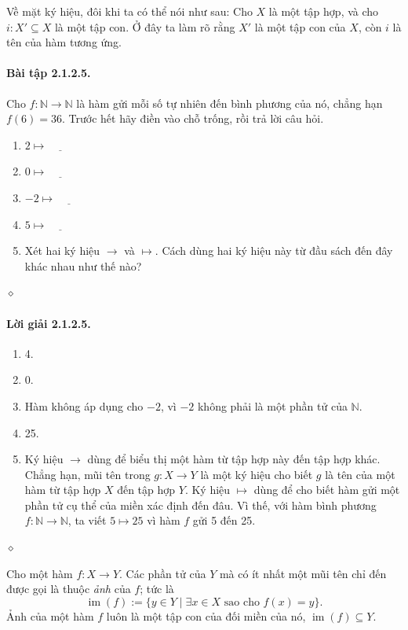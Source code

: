 Về mặt ký hiệu, đôi khi ta có thể nói như sau: Cho $X$ là một tập hợp, và cho $i:X'\subseteq X$ là một tập con. Ở đây ta làm rõ rằng $X'$ là một tập con của $X$, còn $i$ là tên của hàm tương ứng.
\paragraph{Bài tập 2.1.2.5.} Cho $f:\mathbb N\to\mathbb N$ là hàm gửi mỗi số tự nhiên đến bình phương của nó, chẳng hạn $f(6)=36$. Trước hết hãy điền vào chỗ trống, rồi trả lời câu hỏi.
\begin{enumerate}[label=\alph*.]
\item $2\mapsto\underline{\hspace{1cm}}$
\item $0\mapsto\underline{\hspace{1cm}}$
\item $-2\mapsto\underline{\hspace{1cm}}$
\item $5\mapsto\underline{\hspace{1cm}}$
\item Xét hai ký hiệu $\to$ và $\mapsto$. Cách dùng hai ký hiệu này từ đầu sách đến đây khác nhau như thế nào?
\end{enumerate}\hfill$\diamond$
\paragraph{Lời giải 2.1.2.5.}
\begin{enumerate}[label=\alph*.]
\item 4.
\item 0.
\item Hàm không áp dụng cho $-2$, vì $-2$ không phải là một phần tử của $\mathbb N$.
\item 25.
\item Ký hiệu $\to$ dùng để biểu thị một hàm từ tập hợp này đến tập hợp khác. Chẳng hạn, mũi tên trong $g:X\to Y$ là một ký hiệu cho biết $g$ là tên của một hàm từ tập hợp $X$ đến tập hợp $Y$. Ký hiệu $\mapsto$ dùng để cho biết hàm gửi một phần tử cụ thể của miền xác định đến đâu. Vì thế, với hàm bình phương $f:\mathbb N\to\mathbb N$, ta viết $5\mapsto25$ vì hàm $f$ gửi 5 đến 25.
\end{enumerate}\hfill$\diamond$

Cho một hàm $f:X\to Y$. Các phần tử của $Y$ mà có ít nhất một mũi tên chỉ đến được gọi là thuộc \emph{ảnh} của $f$; tức là
\begin{equation*}\operatorname{im}(f):=\{y\in Y\mid\exists x\in X\text{ sao cho }f(x)=y\}.\tag{2.3}\end{equation*}
Ảnh của một hàm $f$ luôn là một tập con của đối miền của nó, $\operatorname{im}(f)\subseteq Y$.
